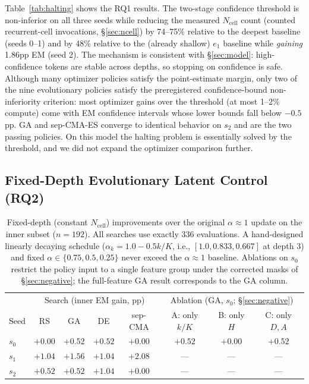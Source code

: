 \documentclass[11pt]{article}
\begin{document}
Table~\ref{tab:halting} shows the RQ1 results. The two-stage confidence threshold is non-inferior on all three seeds while reducing the measured $N_{\mathrm{cell}}$ count (counted recurrent-cell invocations, \S\ref{sec:ncell}) by 74--75\% relative to the deepest baseline (seeds 0--1) and by 48\% relative to the (already shallow) $e_1$ baseline while \emph{gaining} 1.86pp EM (seed 2). The mechanism is consistent with \S\ref{sec:model}: high-confidence tokens are stable across depths, so stopping on confidence is safe. Although many optimizer policies satisfy the point-estimate margin, only two of the nine evolutionary policies satisfy the preregistered confidence-bound non-inferiority criterion: most optimizer gains over the threshold (at most 1--2\% compute) come with EM confidence intervals whose lower bounds fall below $-0.5$pp. GA and sep-CMA-ES converge to identical behavior on $s_2$ and are the two passing policies. On this model the halting problem is essentially solved by the threshold, and we did not expand the optimizer comparison further.

\subsection{Fixed-Depth Evolutionary Latent Control (RQ2)}
\label{sec:exp-latent}

\begin{table}[t]
\centering
\small
\begin{tabular}{lcccc|ccc}
\toprule
& \multicolumn{4}{c|}{Search (inner EM gain, pp)} & \multicolumn{3}{c}{Ablation (GA, $s_0$; \S\ref{sec:negative})} \\
Seed & RS & GA & DE & sep-CMA & A: only $k/K$ & B: only $H$ & C: only $D,A$ \\
\midrule
$s_0$ & $+0.00$ & $+0.52$ & $+0.52$ & $+0.00$ & $+0.52$ & $+0.00$ & $+0.52$ \\
$s_1$ & $+1.04$ & $+1.56$ & $+1.04$ & $+2.08$ & --- & --- & --- \\
$s_2$ & $+0.52$ & $+0.52$ & $+1.04$ & $+0.00$ & --- & --- & --- \\
\bottomrule
\end{tabular}
\caption{Fixed-depth (constant $N_{\mathrm{cell}}$) improvements over the original $\alpha{\approx}1$ update on the inner subset ($n{=}192$). All searches use exactly 336 evaluations. A hand-designed linearly decaying schedule ($\alpha_k = 1.0 - 0.5k/K$, i.e., $[1.0, 0.833, 0.667]$ at depth 3) and fixed $\alpha \in \{0.75, 0.5, 0.25\}$ never exceed the $\alpha{\approx}1$ baseline. Ablations on $s_0$ restrict the policy input to a single feature group under the corrected masks of \S\ref{sec:negative}; the full-feature GA result corresponds to the GA column.}
\label{tab:latent}
\end{table}
\end{document}

